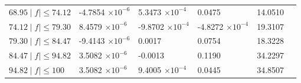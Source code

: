 \documentclass[journal]{IEEEtran}
\begin{document}
\begin{table}[h!]
\begin{tabular}{|C{3.5cm}|C{2.5cm}|C{2.5cm}|C{2.5cm}|C{2.5cm}|m{0cm}}
		$68.95 \mid f\mid \leq 74.12$ & -4.7854 $\times 10^{-6}$  & 5.3473 $\times 10^{-4}$  & 0.0475 					& 14.0510 &\\ 
		$74.12 \mid f\mid \leq 79.30$ & 8.4579  $\times 10^{-6}$  & -9.8702 $\times 10^{-4}$ & -4.8272 $\times 10^{-4}$& 19.3107 &\\ 
		$79.30 \mid f\mid \leq 84.47$ & -9.4143 $\times 10^{-6}$  & 0.0017 				  & 0.0754 					& 18.3228 &\\ 
		$84.47 \mid f\mid \leq 94.82$ & 3.5082 $\times 10^{-6}$   & -0.0013 				  & 0.1190					& 34.2297 &\\ 
		$94.82 \mid f\mid \leq 100$   & 3.5082 $\times 10^{-6}$   & 9.4005 $\times 10^{-4}$  & 0.0445 					& 34.8507 &\\ 
	\end{tabular}
\end{table}
\end{document}
